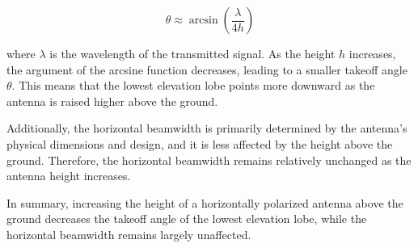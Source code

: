 \[
\theta \approx \arcsin\left(\frac{\lambda}{4h}\right)
\]

where \( \lambda \) is the wavelength of the transmitted signal. As the height \( h \) increases, the argument of the arcsine function decreases, leading to a smaller takeoff angle \( \theta \). This means that the lowest elevation lobe points more downward as the antenna is raised higher above the ground.

Additionally, the horizontal beamwidth is primarily determined by the antenna's physical dimensions and design, and it is less affected by the height above the ground. Therefore, the horizontal beamwidth remains relatively unchanged as the antenna height increases.

In summary, increasing the height of a horizontally polarized antenna above the ground decreases the takeoff angle of the lowest elevation lobe, while the horizontal beamwidth remains largely unaffected.


